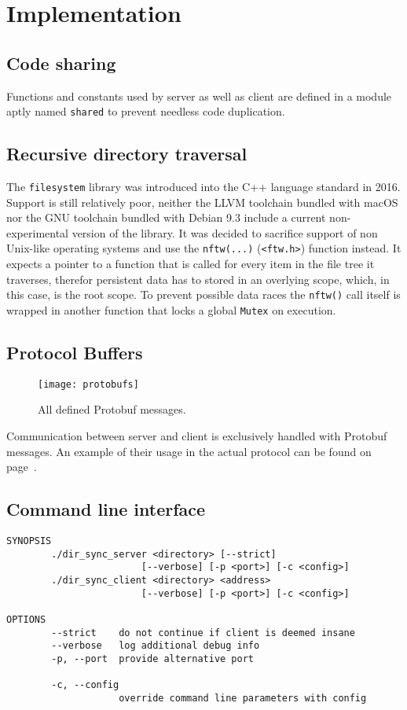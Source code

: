 \documentclass[a4paper]{article}
\begin{document}
\section{Implementation}
\subsection{Code sharing}
Functions and constants used by server as well as client are defined in a module aptly named \texttt{shared} to prevent needless code duplication. 

\subsection{Recursive directory traversal}
The \texttt{filesystem} library was introduced into the C++ language standard in 2016. Support is still relatively poor, neither the LLVM toolchain bundled with macOS nor the GNU toolchain bundled with Debian 9.3 include a current non-experimental version of the library. 
It was decided to sacrifice support of non Unix-like operating systems and use the \texttt{nftw(...)} (\texttt{<ftw.h>}) function instead. It expects a pointer to a function that is called for every item in the file tree it traverses, therefor persistent data has to stored in an overlying scope, which, in this case, is the root scope. To prevent possible data races the \texttt{nftw()} call itself is wrapped in another function that locks a global \texttt{Mutex} on execution.

\subsection{Protocol Buffers}
\begin{figure}[H]
\centering
\texttt{[image: protobufs]}
\caption{All defined Protobuf messages.}
\end{figure}

Communication between server and client is exclusively handled with Protobuf messages. 
An example of their usage in the actual protocol can be found on page~\pageref{sec:phases}.
\newpage

\subsection{Command line interface}
\begin{verbatim}
SYNOPSIS
        ./dir_sync_server <directory> [--strict] 
        			    [--verbose] [-p <port>] [-c <config>]
        ./dir_sync_client <directory> <address>  
        			    [--verbose] [-p <port>] [-c <config>]

OPTIONS
        --strict    do not continue if client is deemed insane
        --verbose   log additional debug info
        -p, --port  provide alternative port

        -c, --config
                    override command line parameters with config
\end{verbatim}
\end{document}
